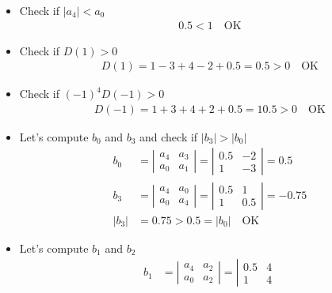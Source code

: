 \documentclass[twoside]{article}
\begin{document}
\begin{itemize}
 \item Check if $|a_4| < a_0 $
%
\begin{align*}
0.5 < 1 \quad \mathrm{OK}
\end{align*}
%
\item Check if $D(1) > 0$
%
\begin{align*}
  D(1) = 1 - 3 + 4 -2 + 0.5 = 0.5 > 0 \quad \mathrm{OK}
\end{align*}
%
\item Check if $(-1)^4 D(-1) > 0$
%
\begin{align*}
  D(-1) = 1 + 3 + 4 + 2 + 0.5 = 10.5 > 0 \quad \mathrm{OK}
\end{align*}
%
\item Let's compute $b_0$ and $b_3$ and check if $|b_3| > |b_0| $
%
\begin{align*}
  b_0 &= \left| \begin{array}{cc} a_4 & a_3 \\ a_0 & a_1 \end{array}
                                                     \right| = 
\left| \begin{array}{cc} 0.5 & -2 \\ 1 & -3 \end{array}
                                                     \right| = 0.5
\\
b_3 &= \left| \begin{array}{cc} a_4 & a_0 \\ a_0 & a_4 \end{array}
                                                     \right| =  \left| \begin{array}{cc} 0.5 & 1 \\ 1 & 0.5 \end{array}
                                                     \right| = -0.75
\\
|b_3| &= 0.75 > 0.5 =  |b_0| \quad \mathrm{OK}
\end{align*}
%
\item Let's compute $b_1$ and $b_2$ 
%
\begin{align*}
  b_1 &= \left| \begin{array}{cc} a_4 & a_2 \\ a_0 & a_2 \end{array}
                                                     \right| = 
\left| \begin{array}{cc} 0.5 & 4 \\ 1 & 4 \end{array}

\end{align*}
\end{itemize}
\end{document}
